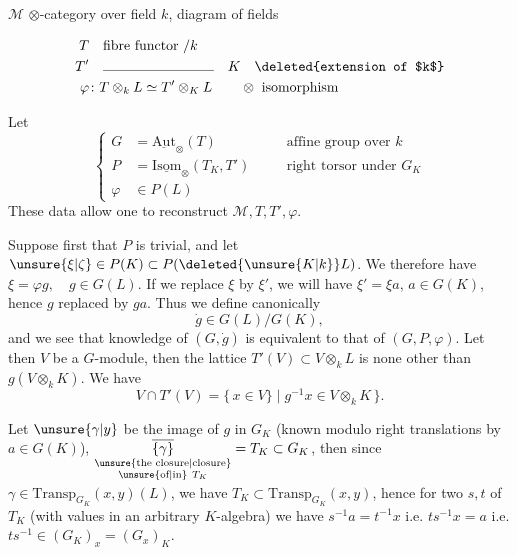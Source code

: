$\mathcal M$ $\otimes$-category over field $k$,
diagram of fields

\[
\begin{aligned}
T&\quad\text{fibre functor }/k\\
T'&\quad\rule{2.8cm}{.35pt}\quad K\quad\text{\deleted{extension of $k$}}\\
\varphi&\colon T\otimes_k L\simeq T'\otimes_K L\qquad\otimes\ \text{isomorphism}
\end{aligned}
\]

Let
\[
\left\{\begin{aligned}
G&=\underline{\mathrm{Aut}}_{\otimes}(T)&\quad&\text{affine group over }k\\
P&=\underline{\mathrm{Isom}}_{\otimes}(T_K,T')&&\text{right torsor under }G_K\\
\varphi&\in P(L)
\end{aligned}\right.
\]
These data allow one to reconstruct $\mathcal M,T,T',\varphi$.

Suppose first that $P$ is trivial, and let $\unsure{\xi|\zeta}\in P(K)\subset P(\deleted{\unsure{K|k}}L)$. We therefore have $\xi=\varphi g,\quad g\in G(L)$. If we replace $\xi$ by $\xi'$, we will have $\xi'=\xi a$, $a\in G(K)$, hence $g$ replaced by $ga$. Thus we define canonically
\[
\dot g\in G(L)/G(K),
\]
and we see that knowledge of $(G,\dot g)$ is equivalent to that of $(G,P,\varphi)$. Let then $V$ be a $G$-module, then the lattice $T'(V)\subset V\otimes_k L$ is none other than $g(V\otimes_k K)$. We have
\[
V\cap T'(V)=\{\,x\in V\}\mid g^{-1}x\in V\otimes_k K\,\}.
\]

  Let $\unsure{\gamma|y}$ be the image of $g$ in $G_K$ (known modulo right translations by $a\in G(K)$), $\underset{\substack{\text{\unsure{the closure|closure}}\\\text{\unsure{of|in}}\ T_K}}{\overline{\{\gamma\}}}=T_K\subset G_K$,  then  since  $\gamma\in\mathrm{Transp}_{G_K}(x,y)(L)$, we have $T_K\subset\mathrm{Transp}_{G_K}(x,y)$,  hence for two   $s,t$  of $T_K$ (with values in an arbitrary $K$-algebra) we have $s^{-1}a=t^{-1}x$ i.e. $ts^{-1}x=a$ i.e. $ts^{-1}\in(G_K)_x=(G_x)_K$.

